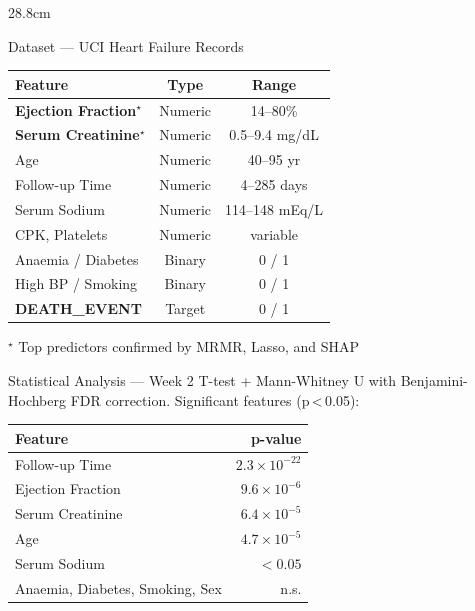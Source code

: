 \documentclass[final]{beamer}
\begin{document}
\begin{frame}[t]{}
\begin{columns}[t, totalwidth=119.2cm]
\begin{column}{28.8cm}
\begin{block}{Dataset — UCI Heart Failure Records}
  \medskip
  \setlength{\tabcolsep}{6pt}
  \renewcommand{\arraystretch}{1.35}
  \begin{tabularx}{\linewidth}{@{}Xcc@{}}
    \toprule
    \textbf{Feature} & \textbf{Type} & \textbf{Range} \\
    \midrule
    \rowcolor{LBlue}\textbf{Ejection Fraction}$^\star$ & Numeric & 14–80\% \\
    \rowcolor{LBlue}\textbf{Serum Creatinine}$^\star$  & Numeric & 0.5–9.4 mg/dL \\
    Age                & Numeric & 40–95 yr \\
    Follow-up Time     & Numeric & 4–285 days \\
    Serum Sodium       & Numeric & 114–148 mEq/L \\
    CPK, Platelets     & Numeric & variable \\
    Anaemia / Diabetes & Binary  & 0 / 1 \\
    High BP / Smoking  & Binary  & 0 / 1 \\
    \textbf{DEATH\_EVENT} & Target & 0 / 1 \\
    \bottomrule
  \end{tabularx}
  \smallskip
  {\small $^\star$ Top predictors confirmed by MRMR, Lasso, and SHAP}
\end{block}

\begin{block}{Statistical Analysis — Week 2}
  T-test + Mann-Whitney U with Benjamini-Hochberg FDR
  correction. Significant features (p\,<\,0.05):

  \medskip
  \setlength{\tabcolsep}{6pt}
  \renewcommand{\arraystretch}{1.35}
  \begin{tabularx}{\linewidth}{@{}Xr@{}}
    \toprule
    \textbf{Feature} & \textbf{p-value} \\
    \midrule
    \rowcolor{LGreen}Follow-up Time    & $2.3\times10^{-22}$ \\
    \rowcolor{LGreen}Ejection Fraction & $9.6\times10^{-6}$  \\
    \rowcolor{LGreen}Serum Creatinine  & $6.4\times10^{-5}$  \\
    \rowcolor{LGreen}Age               & $4.7\times10^{-5}$  \\
    Serum Sodium      & $<0.05$             \\
    Anaemia, Diabetes, Smoking, Sex & n.s. \\
    \bottomrule
  \end{tabularx}
\end{block}


\end{column}
\end{columns}
\end{frame}
\end{document}
